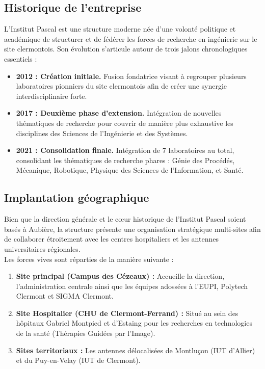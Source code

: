 \documentclass[12pt,a4paper,oneside]{report}
\begin{document}
\newpage

\subsection{Historique de l'entreprise}
L'Institut Pascal est une structure moderne née d'une volonté politique et académique de structurer et de fédérer les forces de recherche en ingénierie sur le site clermontois. Son évolution s'articule autour de trois jalons chronologiques essentiels :
\begin{itemize}
    \item \textbf{2012 : Création initiale.} Fusion fondatrice visant à regrouper plusieurs laboratoires pionniers du site clermontois afin de créer une synergie interdisciplinaire forte.
    \item \textbf{2017 : Deuxième phase d'extension.} Intégration de nouvelles thématiques de recherche pour couvrir de manière plus exhaustive les disciplines des Sciences de l'Ingénierie et des Systèmes.
    \item \textbf{2021 : Consolidation finale.} Intégration de 7 laboratoires au total, consolidant les thématiques de recherche phares : Génie des Procédés, Mécanique, Robotique, Physique des Sciences de l'Information, et Santé.
\end{itemize}

\subsection{Implantation géographique}
Bien que la direction générale et le cœur historique de l'Institut Pascal soient basés à Aubière, la structure présente une organisation stratégique multi-sites afin de collaborer étroitement avec les centres hospitaliers et les antennes universitaires régionales.\\
Les forces vives sont réparties de la manière suivante :
\begin{enumerate}
    \item \textbf{Site principal (Campus des Cézeaux) :} Accueille la direction, l'administration centrale ainsi que les équipes adossées à l'EUPI, Polytech Clermont et SIGMA Clermont.
    \item \textbf{Site Hospitalier (CHU de Clermont-Ferrand) :} Situé au sein des hôpitaux Gabriel Montpied et d'Estaing pour les recherches en technologies de la santé (Thérapies Guidées par l'Image).
    \item \textbf{Sites territoriaux :} Les antennes délocalisées de Montluçon (IUT d'Allier) et du Puy-en-Velay (IUT de Clermont).
\end{enumerate}
\end{document}
